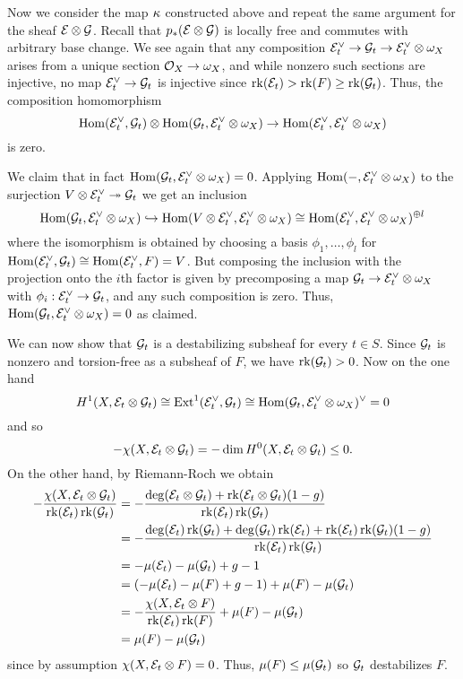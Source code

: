 \documentclass[letterpaper,10pt]{article}
\theoremstyle{remark}
\begin{document}
Now we consider the map $\kappa$ constructed above and repeat the same argument for the sheaf $\mathcal{E} \otimes \mathcal{G}$. Recall that $p_*(\mathcal{E} \otimes \mathcal{G})$ is locally free and commutes with arbitrary base change. We see again that any composition $\mathcal{E}_t^\vee \to \mathcal{G}_t \to \mathcal{E}_t^\vee \otimes \omega_X$ arises from a unique section $\mathcal{O}_X \to \omega_X$, and while nonzero such sections are injective, no map $\mathcal{E}_t^\vee \to \mathcal{G}_t$ is injective since $\operatorname{\mathrm{rk}}(\mathcal{E}_t) > \operatorname{\mathrm{rk}}(F) \ge \operatorname{\mathrm{rk}}(\mathcal{G}_t)$. Thus, the composition homomorphism
\[ \mathrm{Hom}(\mathcal{E}_t^\vee, \mathcal{G}_t) \otimes \mathrm{Hom}(\mathcal{G}_t, \mathcal{E}_t^\vee \otimes \omega_X) \to \mathrm{Hom}(\mathcal{E}_t^\vee, \mathcal{E}_t^\vee \otimes \omega_X) \]
is zero. 

We claim that in fact $\mathrm{Hom}(\mathcal{G}_t, \mathcal{E}_t^\vee \otimes \omega_X) = 0$. Applying $\mathrm{Hom}(-, \mathcal{E}_t^\vee \otimes \omega_X)$ to the surjection $V \otimes \mathcal{E}_t^\vee \twoheadrightarrow \mathcal{G}_t$ we get an inclusion
\[ \mathrm{Hom}(\mathcal{G}_t, \mathcal{E}_t^\vee \otimes \omega_X) \hookrightarrow \mathrm{Hom}(V \otimes \mathcal{E}_t^\vee, \mathcal{E}_t^\vee \otimes \omega_X) \cong \mathrm{Hom}(\mathcal{E}_t^\vee, \mathcal{E}_t^\vee \otimes \omega_X)^{\oplus l} \]
where the isomorphism is obtained by choosing a basis $\phi_1, \ldots, \phi_l$ for $\mathrm{Hom}(\mathcal{E}_t^\vee, \mathcal{G}_t) \cong \mathrm{Hom}(\mathcal{E}_t^\vee, F) = V$. But composing the inclusion with the projection onto the $i$th factor is given by precomposing a map $\mathcal{G}_t \to \mathcal{E}_t^\vee \otimes \omega_X$ with $\phi_i: \mathcal{E}_t^\vee \to \mathcal{G}_t$, and any such composition is zero. Thus, $\mathrm{Hom}(\mathcal{G}_t, \mathcal{E}_t^\vee \otimes \omega_X) = 0$ as claimed.

We can now show that $\mathcal{G}_t$ is a destabilizing subsheaf for every $t \in S$. Since $\mathcal{G}_t$ is nonzero and torsion-free as a subsheaf of $F$, we have $\operatorname{\mathrm{rk}}(\mathcal{G}_t) > 0$. Now on the one hand
\[ H^1(X, \mathcal{E}_t \otimes \mathcal{G}_t) \cong \mathrm{Ext}^1(\mathcal{E}_t^\vee, \mathcal{G}_t) \cong \mathrm{Hom}(\mathcal{G}_t, \mathcal{E}_t^\vee \otimes \omega_X)^\vee = 0 \]
and so
\[ -\chi(X, \mathcal{E}_t \otimes \mathcal{G}_t) = -\dim H^0(X, \mathcal{E}_t \otimes \mathcal{G}_t) \le 0. \]
On the other hand, by Riemann-Roch we obtain
\begin{align*}
    -\frac{\chi(X, \mathcal{E}_t \otimes \mathcal{G}_t)}{\operatorname{\mathrm{rk}}(\mathcal{E}_t) \operatorname{\mathrm{rk}}(\mathcal{G}_t)} & = -\frac{\deg(\mathcal{E}_t \otimes \mathcal{G}_t) + \operatorname{\mathrm{rk}}(\mathcal{E}_t \otimes \mathcal{G}_t)(1-g)}{\operatorname{\mathrm{rk}}(\mathcal{E}_t) \operatorname{\mathrm{rk}}(\mathcal{G}_t)} \\
    & = -\frac{\deg(\mathcal{E}_t)\operatorname{\mathrm{rk}}(\mathcal{G}_t) + \deg(\mathcal{G}_t)\operatorname{\mathrm{rk}}(\mathcal{E}_t) + \operatorname{\mathrm{rk}}(\mathcal{E}_t)\operatorname{\mathrm{rk}}(\mathcal{G}_t)(1-g)}{\operatorname{\mathrm{rk}}(\mathcal{E}_t) \operatorname{\mathrm{rk}}(\mathcal{G}_t)} \\
    & = -\mu(\mathcal{E}_t) - \mu(\mathcal{G}_t) + g - 1 \\
    & = (-\mu(\mathcal{E}_t) - \mu(F) + g - 1) + \mu(F) - \mu(\mathcal{G}_t) \\
    & = -\frac{\chi(X, \mathcal{E}_t \otimes F)}{\operatorname{\mathrm{rk}}(\mathcal{E}_t)\operatorname{\mathrm{rk}}(F)} + \mu(F) - \mu(\mathcal{G}_t) \\
    & = \mu(F) - \mu(\mathcal{G}_t)
\end{align*}
since by assumption $\chi(X, \mathcal{E}_t \otimes F) = 0$. Thus, $\mu(F) \le \mu(\mathcal{G}_t)$ so $\mathcal{G}_t$ destabilizes $F$.
\end{document}

